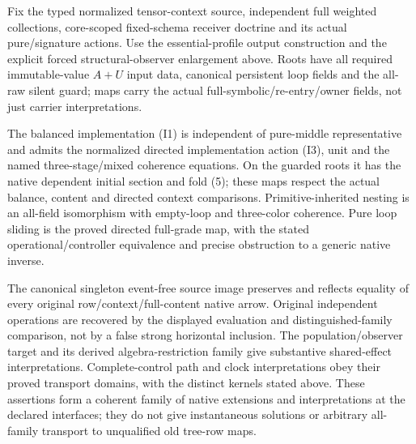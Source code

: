 \documentclass[11pt]{article}
\begin{document}
\begin{theorem}
Fix the typed normalized tensor-context source, independent full weighted collections, core-scoped fixed-schema receiver doctrine and its actual pure/signature actions. Use the essential-profile output construction and the explicit forced structural-observer enlargement above. Roots have all required immutable-value $A+U$ input data, canonical persistent loop fields and the all-raw silent guard; maps carry the actual full-symbolic/re-entry/owner fields, not just carrier interpretations.

The balanced implementation (I1) is independent of pure-middle representative and admits the normalized directed implementation action (I3), unit and the named three-stage/mixed coherence equations. On the guarded roots it has the native dependent initial section and fold (5); these maps respect the actual balance, content and directed context comparisons. Primitive-inherited nesting is an all-field isomorphism with empty-loop and three-color coherence. Pure loop sliding is the proved directed full-grade map, with the stated operational/controller equivalence and precise obstruction to a generic native inverse.

The canonical singleton event-free source image preserves and reflects equality of every original row/context/full-content native arrow. Original independent operations are recovered by the displayed evaluation and distinguished-family comparison, not by a false strong horizontal inclusion. The population/observer target and its derived algebra-restriction family give substantive shared-effect interpretations. Complete-control path and clock interpretations obey their proved transport domains, with the distinct kernels stated above. These assertions form a coherent family of native extensions and interpretations at the declared interfaces; they do not give instantaneous solutions or arbitrary all-family transport to unqualified old tree-row maps.
\end{theorem}
\end{document}
